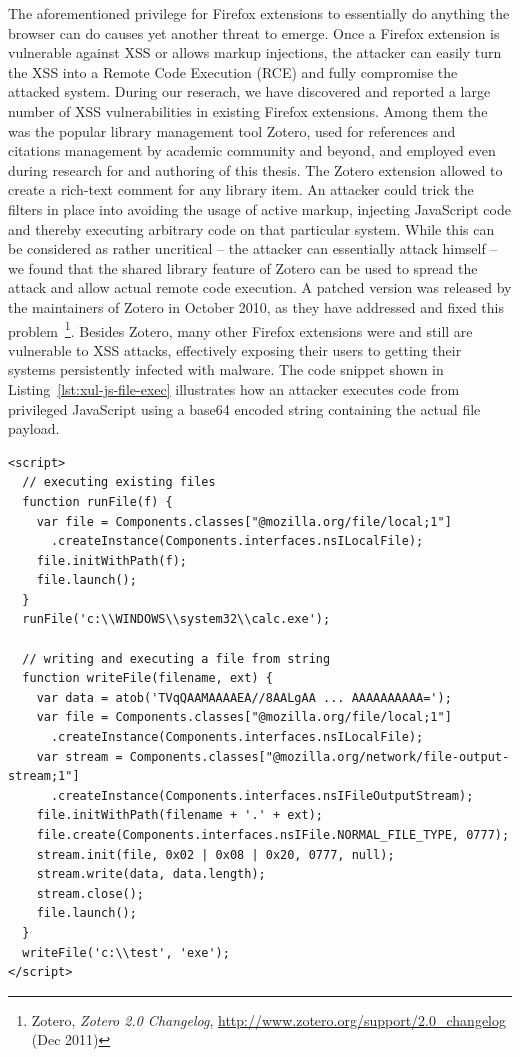 	The aforementioned privilege for Firefox extensions to essentially do anything the browser can do causes yet another threat to emerge. Once a Firefox extension is vulnerable against XSS or allows markup injections, the attacker can easily turn the XSS into a Remote Code Execution (RCE) and fully compromise the attacked system. During our reserach, we have discovered and reported a large number of XSS vulnerabilities in existing Firefox extensions. Among them the was the popular library management tool Zotero, used for references and citations management by academic community and beyond, and employed even during research for and authoring of this thesis. The Zotero extension allowed to create a rich-text comment for any library item. An attacker could trick the filters in place into avoiding the usage of active markup, injecting JavaScript code and thereby executing arbitrary code on that particular system. While this can be considered as rather uncritical -- the attacker can essentially attack himself -- we 
found that the shared library feature of Zotero can be used to spread the attack and allow actual remote code execution. A patched version was released by the maintainers of Zotero in October 2010, as they have addressed and fixed this problem~\footnote{Zotero, \textit{Zotero 2.0 Changelog}, \url{http://www.zotero.org/support/2.0_changelog} (Dec 2011)}. Besides Zotero, many other Firefox extensions were and still are vulnerable to XSS attacks, effectively exposing their users to getting their systems persistently infected with malware. The code snippet shown in Listing~\ref{lst:xul-js-file-exec} illustrates how an attacker executes code from privileged JavaScript using a base64 encoded string containing the actual file payload.

\begin{lstlisting}[captionpos=b,label=lst:xul-js-file-exec,caption=Example for privileged JavaScript executing code; A file is being created from a string and executed - write access to the hard-disk is being obtained]
<script>
  // executing existing files
  function runFile(f) {
    var file = Components.classes["@mozilla.org/file/local;1"]
      .createInstance(Components.interfaces.nsILocalFile);
    file.initWithPath(f);
    file.launch();
  }
  runFile('c:\\WINDOWS\\system32\\calc.exe');

  // writing and executing a file from string
  function writeFile(filename, ext) {
    var data = atob('TVqQAAMAAAAEA//8AALgAA ... AAAAAAAAAA=');
    var file = Components.classes["@mozilla.org/file/local;1"]
      .createInstance(Components.interfaces.nsILocalFile);
    var stream = Components.classes["@mozilla.org/network/file-output-stream;1"]
      .createInstance(Components.interfaces.nsIFileOutputStream);
    file.initWithPath(filename + '.' + ext);	
    file.create(Components.interfaces.nsIFile.NORMAL_FILE_TYPE, 0777);
    stream.init(file, 0x02 | 0x08 | 0x20, 0777, null);
    stream.write(data, data.length);
    stream.close();
    file.launch();
  }
  writeFile('c:\\test', 'exe');
</script>
\end{lstlisting}

